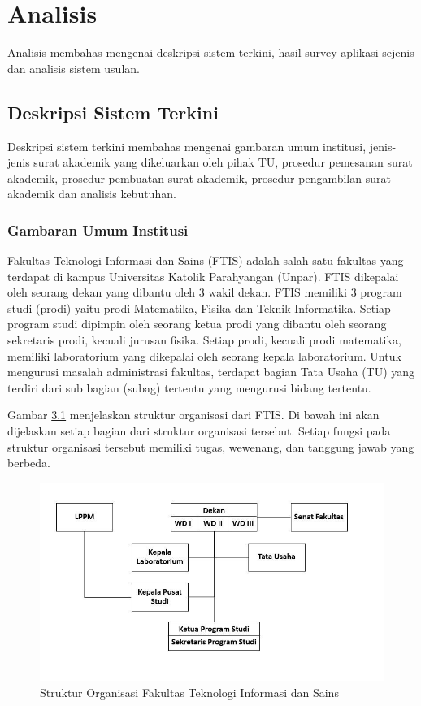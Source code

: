 \chapter{Analisis}
\label{chap:analisis}
Analisis membahas mengenai deskripsi sistem terkini, hasil survey aplikasi sejenis dan analisis sistem usulan.

\section{Deskripsi Sistem Terkini}
\label{sec:deskripsi_sistem_terkini}
Deskripsi sistem terkini membahas mengenai gambaran umum institusi, jenis-jenis surat akademik yang dikeluarkan oleh pihak TU, prosedur pemesanan surat akademik, prosedur pembuatan surat akademik, prosedur pengambilan surat akademik dan analisis kebutuhan. \\

\subsection{Gambaran Umum Institusi}
\label{sec:gambaran_umum_institusi}
Fakultas Teknologi Informasi dan Sains (FTIS) adalah salah satu fakultas yang terdapat di kampus Universitas Katolik Parahyangan (Unpar). FTIS dikepalai oleh seorang dekan yang dibantu oleh 3 wakil dekan. FTIS memiliki 3 program studi (prodi) yaitu prodi Matematika, Fisika dan Teknik Informatika. Setiap program studi dipimpin oleh seorang ketua prodi yang dibantu oleh seorang sekretaris prodi, kecuali jurusan fisika. Setiap prodi, kecuali prodi matematika, memiliki laboratorium yang dikepalai oleh seorang kepala laboratorium. Untuk mengurusi masalah administrasi fakultas, terdapat bagian Tata Usaha (TU) yang terdiri dari sub bagian (subag) tertentu yang mengurusi bidang tertentu.\

Gambar \hyperlink{organigram_fakultas}{3.1} menjelaskan struktur organisasi dari FTIS. Di bawah ini akan dijelaskan  setiap bagian dari struktur organisasi tersebut. Setiap fungsi pada struktur organisasi tersebut memiliki tugas, wewenang, dan tanggung jawab yang berbeda.
\begin{figure}[H]
	\centering
		\includegraphics[scale=0.65]{Gambar/Diagram/sistem_terkini/organigram/organigram_fakultas.JPG}
	\caption{Struktur Organisasi Fakultas Teknologi Informasi dan Sains}
	\label{fig:organigram_fakultas}
\end{figure}

